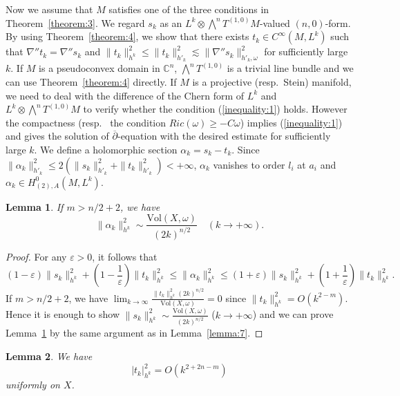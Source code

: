 \documentclass[12pt,oneside]{amsart}
\theoremstyle{plain}
\newtheorem{lemma}{Lemma}
\theoremstyle{definition}
\theoremstyle{remark}
\begin{document}
Now we assume that $M$ satisfies one of the three conditions in Theorem~\ref{theorem:3}.  
We regard $s_{k}$ as an $L^k \otimes \bigwedge^{n} T^{(1, 0)}M$-valued $(n, 0)$-form.  
By using Theorem~\ref{theorem:4}, 
we show that there exists $t_{k} \in C^{\infty}(M, L^k)$ such that $\nabla'' t_{k} = \nabla'' s_{k}$ and $\|t_k\|^2_{h^k} \leq \|t_{k}\|^2_{h'_k} \lesssim \|\nabla'' s_{k}\|^2_{h'_k, \omega}$ for sufficiently large $k$.   
If $M$ is a pseudoconvex domain in $\mathbb{C}^n$, $\bigwedge^n T^{(1, 0)}$ is a trivial line bundle and we can use Theorem~\ref{theorem:4} directly.  
If $M$ is a projective (resp.~Stein) manifold, we need to deal with the difference of the Chern form of $L^k$ and $L^k \otimes \bigwedge^n T^{(1, 0)} M$ to verify whether the condition (\ref{inequality:1}) holds.  
However the compactness (resp.~ the condition $Ric (\omega) \geq -C\omega$) implies (\ref{inequality:1}) and gives the solution of $\overline{\partial}$-equation with the desired estimate for sufficiently large $k$.  
We define a holomorphic section $\alpha_{k} = s_{k} - t_{k}$.  
%
Since $\|\alpha_k\|^2_{h'_{k}} \leq 2(\|s_k\|^2_{h'_k} + \|t_k\|^2_{h'_k}) < + \infty$, $\alpha_k$ vanishes to order $l_{i}$ at $a_i$ and 
$\alpha_k \in H^{0}_{(2), A} (M, L^k)$.   
\begin{lemma}\label{lemma:2}
If $m > n/2 + 2$, we have 
\[
\|\alpha_{k}\|^2_{h^k} \sim \frac{\mathrm{Vol}(X, \omega)}{(2k)^{n/2}} \quad (k \to +\infty).  
\]
\end{lemma}
\begin{proof}
For any $\varepsilon > 0$, 
it follows that 
\[
(1-\varepsilon) \|s_{k}\|^2_{h^k} + \left(1-\frac{1}{\varepsilon}\right) \|t_{k}\|_{h^k}^2 \leq \|\alpha_{k}\|^2_{h^k} \leq (1+\varepsilon) \|s_{k}\|^2_{h^k} + \left(1+\frac{1}{\varepsilon}\right) \|t_{k}\|^2_{h^k}.  
\]
If $m > n/2 + 2$, we have $\lim_{k \to \infty}\frac{\|t_k\|^2_{h^k} (2k)^{n/2}}{\mathrm{Vol} (X, \omega)} = 0$ since $\|t_k\|_{h^k}^2 = O(k^{2-m})$.  
Hence it is enough to show $\|s_{k}\|^2_{h^k} \sim \frac{\mathrm{Vol}(X, \omega)}{(2k)^{n/2}}$ ($k \to +\infty$) and we can prove Lemma~\ref{lemma:2} by the same argument as in Lemma~\ref{lemma:7}.  
\end{proof}

\begin{lemma}\label{lemma:3}
We have 
\[
|t_{k}|^2_{h^k} = O(k^{2+2n-m})
\]
uniformly on $X$.  
\end{lemma}
\end{document}
